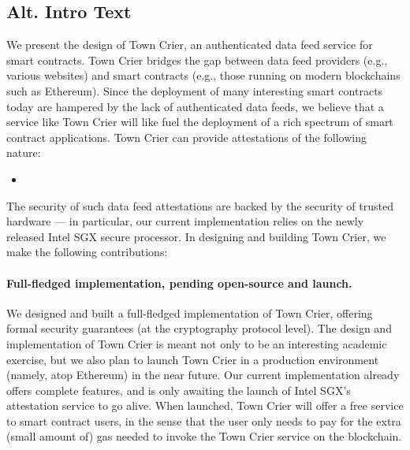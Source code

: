 \subsection{Alt. Intro Text}


We present the design of Town Crier, an authenticated data feed service for smart contracts. 
Town Crier bridges the gap between data 
feed providers (e.g., various websites)
and smart contracts (e.g., those running on modern blockchains
such as Ethereum). Since the deployment
of many interesting smart contracts 
today are hampered by the lack of authenticated data feeds,
we believe that a service like Town Crier will like
fuel the deployment of a rich spectrum  
of smart contract applications.
Town Crier can provide attestations of the following nature:

\begin{itemize}[leftmargin=3mm]
\item[]
\end{itemize}


The security of such data feed attestations
are backed by the security of trusted hardware --- in particular,
our current implementation relies on the newly released Intel SGX secure processor.
In designing and building Town Crier, we make the following contributions:

\paragraph{Full-fledged implementation, pending open-source and launch.}
We designed and built a full-fledged
implementation of Town Crier, offering formal security guarantees
(at the cryptography protocol level).
The design and implementation of Town Crier is meant not only to be  
an interesting academic exercise, but we also plan
to launch Town Crier 
in a production environment (namely, atop Ethereum)
in the near future. 
Our current implementation already offers complete features, and is
only awaiting  
the launch of Intel SGX's attestation service  
to go alive.
When launched, Town Crier will offer a free service to smart contract users, in the sense
that the user only needs to pay for the extra (small amount of) gas
needed to invoke the Town Crier
service on the blockchain. 

